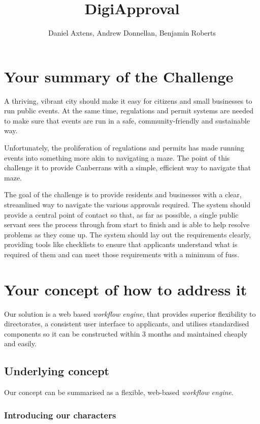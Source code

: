 \documentclass[12pt]{article}
\title{DigiApproval}
\author{Daniel Axtens, Andrew Donnellan, Benjamin Roberts}
\begin{document}
\maketitle

\section{Your summary of the Challenge}
A thriving, vibrant city should make it easy for citizens and small
businesses to run public events. At the same time, regulations and
permit systems are needed to make sure that events are run in a safe,
community-friendly and sustainable way.

Unfortunately, the proliferation of regulations and permits has made
running events into something more akin to navigating a maze. The
point of this challenge it to provide Canberrans with a simple,
efficient way to navigate that maze.

The goal of the challenge is to provide residents and businesses with
a clear, streamlined way to navigate the various approvals
required. The system should provide a central point of contact so
that, as far as possible, a single public servant sees the process
through from start to finish and is able to help resolve problems as
they come up. The system should lay out the requirements clearly,
providing tools like checklists to ensure that applicants understand
what is required of them and can meet those requirements with a
minimum of fuss.

\section{Your concept of how to address it}

Our solution is a web based \emph{workflow engine}, that provides
superior flexibility to directorates, a consistent user interface to
applicants, and utilises standardised components so it can be
constructed within 3 months and maintained cheaply and easily.
\newpage
\subsection{Underlying concept}

Our concept can be summarised as a flexible, web-based \emph{workflow
engine}.

\subsubsection{Introducing our characters}
\end{document}
